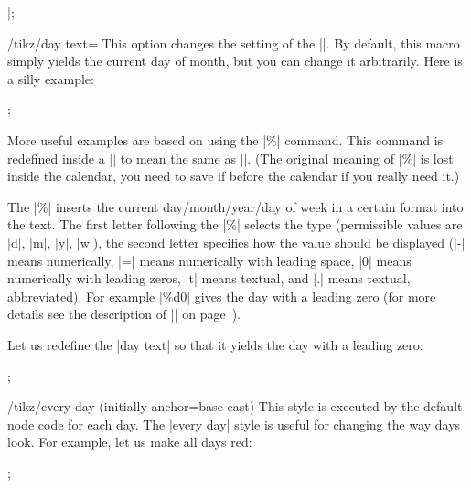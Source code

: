 \begin{command}{\calendar {}|;|}
    \begin{key}{/tikz/day text=}
        This option changes the setting of the |\tikzdaytext|. By default, this
        macro simply yields the current day of month, but you can change it
        arbitrarily. Here is a silly example:
\begin{codeexample}[preamble={\usetikzlibrary{calendar}}]
\tikz \calendar[dates=2000-01-01 to 2000-01-31,week list,
                day text=x];
\end{codeexample}
        More useful examples are based on using the |\%| command. This command
        is redefined inside a |\pgfcalendar| to mean the same as
        |\pgfcalendarshorthand|. (The original meaning of |\%| is lost inside
        the calendar, you need to save if before the calendar if you really
        need it.)

        The |\%| inserts the current day/month/year/day of week in a certain
        format into the text. The first letter following the |\%| selects the
        type (permissible values are |d|, |m|, |y|, |w|), the second letter
        specifies how the value should be displayed (|-| means numerically, |=|
        means numerically with leading space, |0| means numerically with
        leading zeros, |t| means textual, and |.| means textual, abbreviated).
        For example |\%d0| gives the day with a leading zero (for more details
        see the description of |\pgfcalendarshorthand| on
        page~\pageref{pgfcalendarshorthand}).

        Let us redefine the |day text| so that it yields the day with a leading
        zero:
\begin{codeexample}[leave comments,preamble={\usetikzlibrary{calendar}}]
\tikz \calendar[dates=2000-01-01 to 2000-01-31,week list,
                day text=\%d0];
\end{codeexample}
    \end{key}

    \begin{key}{/tikz/every day (initially {anchor=base east})}
        This style is executed by the default node code for each day. The
        |every day| style is useful for changing the way days look. For
        example, let us make all days red:
\begin{codeexample}[leave comments,preamble={\usetikzlibrary{calendar}}]
\tikz[every day/.style=red]
  \calendar[dates=2000-01-01 to 2000-01-31,week list];
\end{codeexample}
    \end{key}



\end{command}
